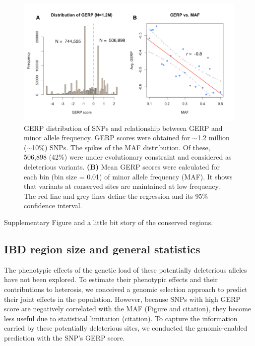 \documentclass[9pt,twocolumn,twoside]{gsajnl}
\begin{document}
\begin{figure}[htbp]
\centering
\includegraphics[width=\linewidth]{Figure_gerpmaf.pdf}
\caption{GERP distribution of SNPs and relationship between GERP and minor allele frequency. GERP scores were obtained for $\sim$1.2 million ($\sim$10\%) SNPs. The spikes of the MAF distribution. Of these, 506,898 (42\%) were under evolutionary constraint and considered as deleterious variants. 
\textbf{(B)} Mean GERP scores were calculated for each bin (bin size = 0.01) of minor allele frequency (MAF). It shows that variants at conserved sites are maintained at low frequency. The red line and grey lines define the regression and its 95\% confidence interval.}
\label{fig:gerpmaf}
\end{figure}


Supplementary Figure and a little bit story of the conserved regions.


\subsection*{IBD region size and general statistics}

The phenotypic effects of the genetic load of these potentially deleterious alleles have not been explored. To estimate their phenotypic effects and their contributions to heterosis, we conceived a genomic selection approach to predict their joint effects in the population. However, because SNPs with high GERP score are negatively correlated with the MAF (Figure and citation), they become less useful due to statistical limitation (citation). To capture the information carried by these potentially deleterious sites, we conducted the genomic-enabled prediction with the SNP's GERP score. 
\end{document}
